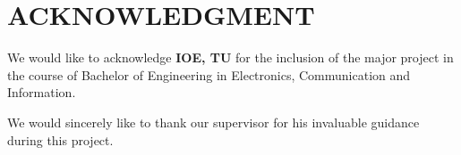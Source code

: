 \documentclass{ioereport}
\begin{document}


\coverpage

\coverpageB
    
\pagebreak
    
\section*{ACKNOWLEDGMENT}
    We would like to acknowledge \textbf{IOE, TU} for the inclusion of the major project in the course of Bachelor of Engineering in Electronics, Communication and Information. 
    
    We would sincerely like to thank our supervisor \textbf{\supervisorname} for his invaluable guidance during this project.
    
\end{document}
